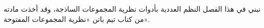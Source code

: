 \documentclass[../../../include/open-logic-section]{subfiles}
\begin{document}

\begin{editorial}
نبني في هذا الفصل النظم العددية بأدوات نظرية المجموعات الساذجة، وقد أخذت مادته من كتاب تيم باتن «نظرية المجموعات المفتوحة».
\end{editorial}


\OLEndChapterHook
\end{document}
